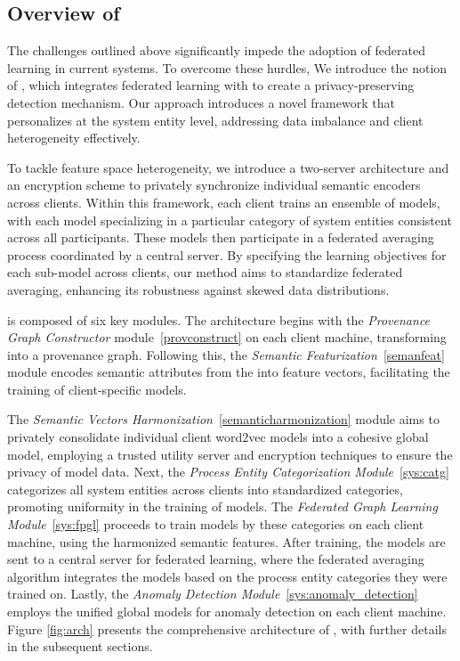 \subsection{Overview of \Sys}
The challenges outlined above significantly impede the adoption of federated learning in current systems. To overcome these hurdles, We introduce the notion of \fpgl , which integrates federated learning with \grl to create a privacy-preserving detection mechanism. Our approach introduces a novel framework that personalizes \grl at the system entity level, addressing data imbalance and client heterogeneity effectively.

To tackle feature space heterogeneity, we introduce a two-server architecture and an encryption scheme to privately synchronize individual semantic encoders across clients. Within this framework, each client trains an ensemble of \gnnshort models, with each model specializing in a particular category of system entities consistent across all participants. These models then participate in a federated averaging process coordinated by a central server. By specifying the learning objectives for each sub-model across clients, our method aims to standardize federated averaging, enhancing its robustness against skewed data distributions.

\Sys is composed of six key modules. The architecture begins with the \textit{Provenance Graph Constructor} module~\ref{provconstruct} on each client machine, transforming \logs into a provenance graph. Following this, the \textit{Semantic Featurization}~\ref{semanfeat} module encodes semantic attributes from the \logs into feature vectors, facilitating the training of client-specific \gnnshort models.

The \textit{Semantic Vectors Harmonization}~\ref{semanticharmonization} module aims to privately consolidate individual client word2vec models into a cohesive global model, employing a trusted utility server and encryption techniques to ensure the privacy of model data. Next, the \textit{Process Entity Categorization Module}~\ref{sys:catg} categorizes all system entities across clients into standardized categories, promoting uniformity in the training of \gnnshort models. The \textit{Federated Graph Learning Module}~\ref{sys:fpgl} proceeds to train \gnnshort models by these categories on each client machine, using the harmonized semantic features. After training, the models are sent to a central server for federated learning, where the federated averaging algorithm integrates the models based on the process entity categories they were trained on. Lastly, the \textit{Anomaly Detection Module}~\ref{sys:anomaly_detection} employs the unified global models for anomaly detection on each client machine. Figure \ref{fig:arch} presents the comprehensive architecture of \Sys, with further details in the subsequent sections.

